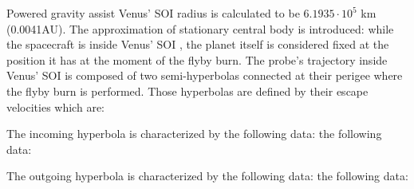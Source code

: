 \documentclass[11pt,a4paper]{report}
\begin{document}
Powered gravity assist
Venus’ SOI radius is calculated to be $6.1935\cdot10^{5}$ km (0.0041AU).
The approximation of stationary central body is introduced: while the spacecraft is inside Venus’ SOI , the planet itself is considered fixed at the position it has at the moment of the flyby burn.
The probe’s trajectory inside Venus’ SOI is composed of two semi-hyperbolas connected at their perigee where the flyby burn is performed. Those hyperbolas are defined by their escape velocities which are:

\begin{table}[H]
\centering
{}
\end{table}

The incoming hyperbola is characterized by the following data:
the following data:

\begin{table}[H]
\centering
{}
\end{table}

The outgoing hyperbola is characterized by the following data:
the following data:

\begin{table}[H]
\centering
{}
\end{table}
\end{document}
